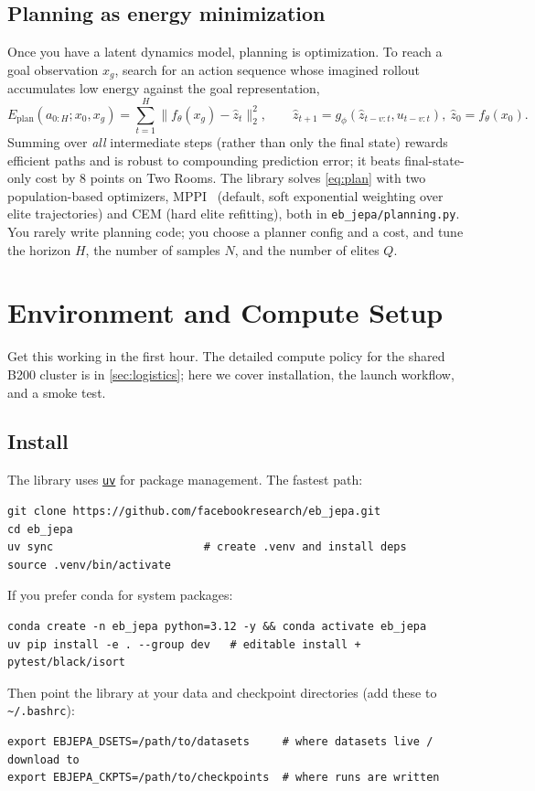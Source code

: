 \documentclass{article}
\newcommand{\code}[1]{\texttt{\small #1}}
\newcommand{\file}[1]{\texttt{\small #1}}
\begin{document}
\subsection{Planning as energy minimization}
\label{sec:planning}

Once you have a latent dynamics model, planning is optimization. To reach a goal
observation $x_g$, search for an action sequence whose imagined rollout
accumulates low energy against the goal representation,
\begin{equation}
E_{\text{plan}}(a_{0:H}; x_0, x_g) = \sum_{t=1}^{H} \|f_\theta(x_g) - \hat{z}_t\|_2^2,
\qquad \hat{z}_{t+1} = g_\phi(\hat{z}_{t-v:t}, u_{t-v:t}),\ \hat{z}_0 = f_\theta(x_0).
\label{eq:plan}
\end{equation}
Summing over \emph{all} intermediate steps (rather than only the final state)
rewards efficient paths and is robust to compounding prediction error; it beats
final-state-only cost by $8$ points on Two Rooms. The library solves
\cref{eq:plan} with two population-based optimizers, MPPI~\citep{MPPI} (default,
soft exponential weighting over elite trajectories) and CEM (hard elite
refitting), both in \file{eb\_jepa/planning.py}. You rarely write planning code;
you choose a planner config and a cost, and tune the horizon $H$, the number of
samples $N$, and the number of elites $Q$.
\section{Environment and Compute Setup}
\label{sec:setup}

Get this working in the first hour. The detailed compute policy for the shared
B200 cluster is in \cref{sec:logistics}; here we cover installation, the launch
workflow, and a smoke test.

\subsection{Install}

The library uses \href{https://docs.astral.sh/uv/}{\code{uv}} for package
management. The fastest path:
\begin{lstlisting}[style=bash]
git clone https://github.com/facebookresearch/eb_jepa.git
cd eb_jepa
uv sync                       # create .venv and install deps
source .venv/bin/activate
\end{lstlisting}
If you prefer conda for system packages:
\begin{lstlisting}[style=bash]
conda create -n eb_jepa python=3.12 -y && conda activate eb_jepa
uv pip install -e . --group dev   # editable install + pytest/black/isort
\end{lstlisting}
Then point the library at your data and checkpoint directories (add these to
\code{\textasciitilde/.bashrc}):
\begin{lstlisting}[style=bash]
export EBJEPA_DSETS=/path/to/datasets     # where datasets live / download to
export EBJEPA_CKPTS=/path/to/checkpoints  # where runs are written
\end{lstlisting}
\end{document}
